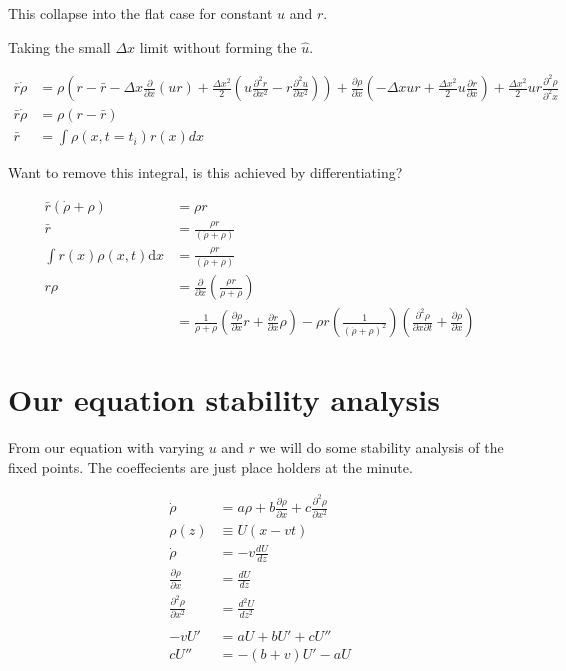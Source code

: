 \documentclass[a4paper]{article}
\begin{document}
This collapse into the flat case for constant $u$  and $r$. 


Taking the small $\Delta x$ limit without forming the $\hat{u}$. 

\begin{align*}
\overline{r} \dot{\rho} & = \rho \left(r - \bar{r} - \Delta x \frac{\partial}{\partial x} (ur) + \frac{\Delta x ^2}{2} ( u \frac{\partial ^2 r}{\partial x^2} - r \frac{\partial ^2 u}{\partial x^2} ) \right) + \frac{\partial \rho}{\partial x} \left(- \Delta x u r + \frac{\Delta x^2}{2} u \frac{\partial r}{\partial x} \right) + \frac{\Delta x^2}{2} ur \frac{\partial ^2 \rho}{\partial ^2 x} \\
 \bar{r} \dot{\rho} & = \rho \left(r - \bar{r} \right) \\
 \bar{r} & = \int \rho(x, t = t_i) r(x) dx  
\end{align*}

Want to remove this integral, is this achieved by differentiating? 

\begin{align*}
\bar{r} \left( \dot{\rho} + \rho \right) & = \rho r \\
\bar{r} & = \frac{\rho r}{(\dot{\rho} + \rho )} \\
\int r(x) \rho(x , t) \mathrm{d} x & = \frac{\rho r}{(\dot{\rho} + \rho )} \\
r \rho & =\frac{\partial}{\partial x} \left( \frac{\rho r}{\dot{\rho} + \rho} \right) \\
& = \frac{1}{\dot{\rho} + \rho} \left( \frac{\partial \rho}{\partial x} r + \frac{\partial r}{\partial x} \rho \right) - \rho r \left( \frac{1}{(\dot{\rho} + \rho ) ^2} \right) \left( \frac{\partial ^2 \rho}{\partial x \partial t} + \frac{\partial \rho}{\partial	 x} \right)
\end{align*}

\newpage

\section*{Our equation stability analysis}

From our equation with varying $u$ and $r$ we will do some stability analysis of the fixed points. The coeffecients are just place holders at the minute. 

\begin{align*}
\dot{\rho} & = a \rho + b \frac{\partial \rho}{\partial x} +c \frac{\partial ^2 \rho}{\partial x ^2} \\
\rho (z) & \equiv U(x-vt) \\
\dot{\rho} & = - v \frac{dU}{dz} \\
\frac{\partial \rho}{\partial x} & = \frac{d U}{d z} \\
\frac{\partial ^2 \rho}{\partial x ^2} & = \frac{d ^2 U}{d z^2} \\
\\
- v U ' & = a U + b U' + c U'' \\
c U '' & = - (b + v) U' - a U \\
\end{align*}
\end{document}
